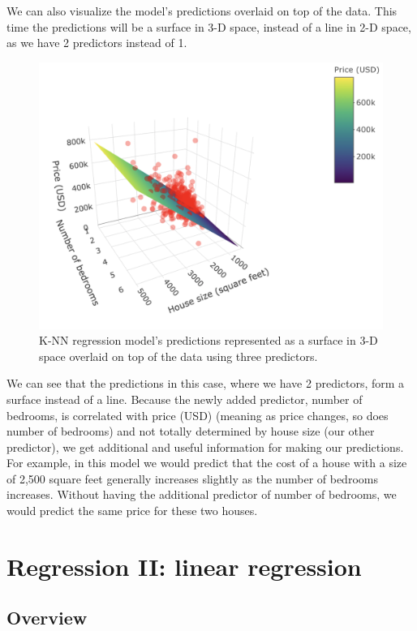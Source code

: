 \documentclass[
]{krantz}
\begin{document}
We can also visualize the model's predictions overlaid on top of the data. This time the predictions
will be a surface in 3-D space, instead of a line in 2-D space, as we have 2
predictors instead of 1.

\begin{figure}
\includegraphics[width=26.72in]{img/lm-regr_3d} \caption{K-NN regression model’s predictions represented as a surface in 3-D space overlaid on top of the data using three predictors.}\label{fig:07-knn-mult-viz}
\end{figure}

We can see that the predictions in this case, where we have 2 predictors, form
a surface instead of a line. Because the newly added predictor, number of
bedrooms, is correlated with price (USD) (meaning as price changes, so does
number of bedrooms) and not totally determined by house size (our other predictor),
we get additional and useful information for making our
predictions. For example, in this model we would predict that the cost of a
house with a size of 2,500 square feet generally increases slightly as the number
of bedrooms increases. Without having the additional predictor of number of
bedrooms, we would predict the same price for these two houses.

\hypertarget{regression2}{%
\chapter{Regression II: linear regression}\label{regression2}}

\hypertarget{overview-7}{%
\section{Overview}\label{overview-7}}
\end{document}
